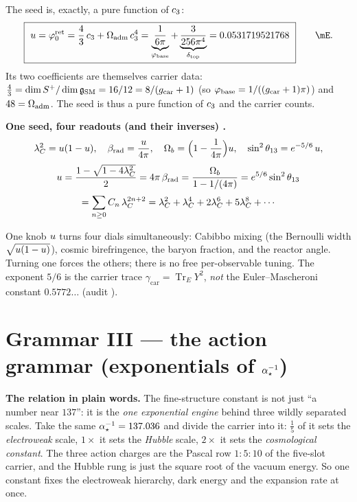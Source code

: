 The seed is, exactly, a pure function of $c_3$:
\begin{equation}
  \boxed{\ \useed=\varphi^{\mathrm{ret}}_0=\frac43\,\cthree+\Oadm\,\cthree^4
  =\underbrace{\frac{1}{6\pi}}_{\phibase}+\underbrace{\frac{3}{256\pi^4}}_{\dtop}=0.0531719521768\ }\qquad\mE.
\end{equation}
Its two coefficients are themselves carrier data: $\tfrac43=\dim S^+/\dim\mathfrak g_{\mathrm{SM}}=16/12=8/(g_{\mathrm{car}}+1)$ (so
$\varphi_{\mathrm{base}}=1/((g_{\mathrm{car}}+1)\pi)$) and $48=\Omega_{\mathrm{adm}}$. The seed is thus a pure function of $c_3$ and the
carrier counts.

\par\smallskip\noindent\textbf{One seed, four readouts (and their inverses) \mE.}
\[
  \lambda_C^2=u(1-u),\quad
  \beta_{\mathrm{rad}}=\frac{u}{4\pi},\quad
  \Omega_b=\Bigl(1-\frac{1}{4\pi}\Bigr)u,\quad
  \sin^2\theta_{13}=e^{-5/6}\,u,
\]
\[
\begin{gathered}
  u=\frac{1-\sqrt{1-4\lambda_C^2}}{2}=4\pi\,\beta_{\mathrm{rad}}=\frac{\Omega_b}{1-1/(4\pi)}=e^{5/6}\sin^2\theta_{13}\\[2pt]
  =\sum_{n\ge0}C_n\,\lambda_C^{2n+2}=\lambda_C^2+\lambda_C^4+2\lambda_C^6+5\lambda_C^8+\cdots
\end{gathered}
\]
\par\smallskip

\noindent One knob $u$ turns four dials simultaneously: Cabibbo mixing (the Bernoulli width
$\sqrt{u(1-u)}$), cosmic birefringence, the baryon fraction, and the reactor angle. Turning
one forces the others; there is no free per-observable tuning. The exponent $5/6$ is the carrier
trace $\gamma_{\mathrm{car}}=\operatorname{Tr}_E Y^2$, \emph{not} the Euler--Mascheroni constant
$0.5772\ldots$ (audit \mO).

\section{Grammar III --- the action grammar (exponentials of $\alpha^{-1}_\star$)}

\noindent\textbf{The relation in plain words.} The fine-structure constant is not just ``a number near
$137$'': it is the \emph{one exponential engine} behind three wildly separated scales. Take the same
$\alpha^{-1}_\star=137.036$ and divide the carrier into it: $\tfrac15$ of it sets the \emph{electroweak} scale,
$1\times$ it sets the \emph{Hubble} scale, $2\times$ it sets the \emph{cosmological constant}. The three
action charges are the Pascal row $1:5:10$ of the five-slot carrier, and the Hubble rung is just the
square root of the vacuum energy. So one constant fixes the electroweak hierarchy, dark energy and the
expansion rate at once.


